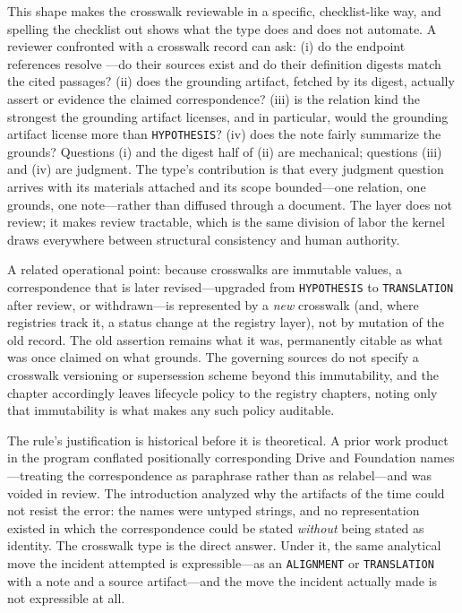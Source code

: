 This shape makes the crosswalk reviewable in a specific,
checklist-like way, and spelling the checklist out shows what the
type does and does not automate. A reviewer confronted with a
crosswalk record can ask: (i) do the endpoint references resolve
---do their sources exist and do their definition digests match
the cited passages? (ii) does the grounding artifact, fetched by
its digest, actually assert or evidence the claimed
correspondence? (iii) is the relation kind the strongest the
grounding artifact licenses, and in particular, would the
grounding artifact license more than \texttt{HYPOTHESIS}?
(iv) does the note fairly summarize the grounds? Questions (i)
and the digest half of (ii) are mechanical; questions (iii) and
(iv) are judgment. The type's contribution is that every judgment
question arrives with its materials attached and its scope
bounded---one relation, one grounds, one note---rather than
diffused through a document. The layer does not review; it makes
review tractable, which is the same division of labor the kernel
draws everywhere between structural consistency and human
authority.

A related operational point: because crosswalks are immutable
values, a correspondence that is later revised---upgraded from
\texttt{HYPOTHESIS} to \texttt{TRANSLATION} after review, or
withdrawn---is represented by a \emph{new} crosswalk (and, where
registries track it, a status change at the registry layer), not
by mutation of the old record. The old assertion remains what it
was, permanently citable as what was once claimed on what grounds.
The governing sources do not specify a crosswalk versioning or
supersession scheme beyond this immutability, and the chapter
accordingly leaves lifecycle policy to the registry chapters,
noting only that immutability is what makes any such policy
auditable.

\begin{finding}\label{ch03:finding-incident}
The rule's justification is historical before it is theoretical.
A prior work product in the program conflated positionally
corresponding Drive and Foundation names---treating the
correspondence as paraphrase rather than as relabel---and was
voided in review. The introduction analyzed why the artifacts of
the time could not resist the error: the names were untyped
strings, and no representation existed in which the correspondence
could be stated \emph{without} being stated as identity. The
crosswalk type is the direct answer. Under it, the same analytical
move the incident attempted is expressible---as an
\texttt{ALIGNMENT} or \texttt{TRANSLATION} with a note and a
source artifact---and the move the incident actually made is not
expressible at all.
\end{finding}

